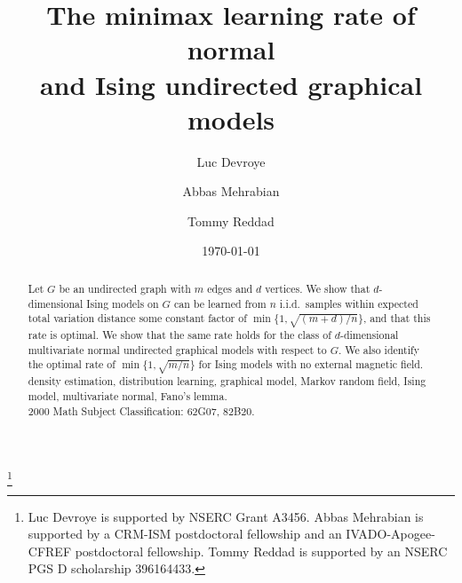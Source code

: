 \documentclass[letterpaper]{amsart}
\numberwithin{thm}{section}
\theoremstyle{definition}
\theoremstyle{plain}
\begin{document}
\title[Minimax Rates of Normal \& Ising MRF]{The minimax learning rate of normal \\ and Ising undirected graphical models}
\author{Luc Devroye}
\author{Abbas Mehrabian}
\author{Tommy Reddad}
\address{School of Computer Science, McGill University, 3480 University Street, Montr\'{e}al, Qu\'{e}bec, Canada, H3A 2K6}
\thanks{Luc Devroye is supported by NSERC Grant A3456. Abbas Mehrabian is supported by a CRM-ISM postdoctoral fellowship and an IVADO-Apogee-CFREF postdoctoral fellowship. Tommy Reddad is supported by an NSERC PGS D scholarship 396164433.}
\date{\today}




\maketitle

\begin{abstract}
  {Let $G$ be an undirected graph with $m$ edges and $d$ vertices. We
  show that $d$-dimensional Ising models on $G$ can be learned from
  $n$ i.i.d.\ samples within expected total variation distance some
  constant factor of $\min\{1, \sqrt{(m + d)/n}\}$, and that this rate
  is optimal. We show that the same rate holds for the class of
  $d$-dimensional multivariate normal undirected graphical models with
  respect to $G$. We also identify the optimal rate of
  $\min\{1, \sqrt{m/n}\}$ for Ising models with no external magnetic
  field.}
  {density estimation, distribution learning, graphical model, Markov
  random field, Ising model, multivariate normal, Fano's lemma.}
  \\
  2000 Math Subject Classification: 62G07, 82B20.
\end{abstract}
\end{document}

